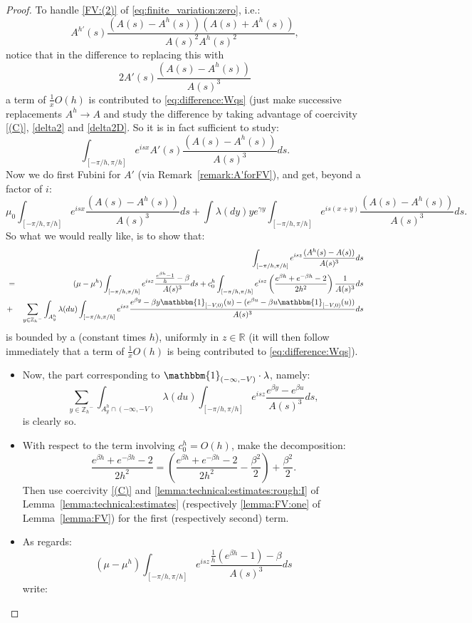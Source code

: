 \documentclass[pdftex,oneside,11pt,reqno]{amsart}
\theoremstyle{definition}
\theoremstyle{theorem}
\theoremstyle{remark}
\numberwithin{equation}{section}
\numberwithin{definition}{section}
\begin{document}
\begin{proof}
To handle \ref{FV:(2)} of \eqref{eq:finite_variation:zero}, i.e.: $$A^{h\prime}(s)\frac{(A(s)-A^h(s))(A(s)+A^h(s))}{A(s)^2A^h(s)^2},$$ notice that in the difference to replacing this with $$2A'(s)\frac{(A(s)-A^h(s))}{A(s)^3}$$ a term of $\frac{1}{x}O(h)$ is contributed to \eqref{eq:difference:Wqs} (just make successive replacements $A^h\to A$ and study the difference by taking advantage of coercivity \ref{(C)}, \ref{delta2} and \ref{delta2D}. So it is in fact sufficient to study: $$\int_{[-\pi/h,\pi/h]}e^{isx}A'(s)\frac{(A(s)-A^h(s))}{A(s)^3}ds.$$ Now we do first Fubini for $A'$ (via Remark~\ref{remark:A'forFV}), and get, beyond a factor of $i$: $$\mu_0 \int_{[-\pi/h,\pi/h]}e^{isx}\frac{(A(s)-A^h(s))}{A(s)^3}ds+\int {\lambda}(dy)ye^{\gamma y}\int_{[-\pi/h,\pi/h]}e^{is(x+y)}\frac{(A(s)-A^h(s))}{A(s)^3}ds.$$ So what we would really like, is to show that:
\footnotesize
\begin{eqnarray}
\nonumber&& \int_{[-\pi/h,\pi/h]}e^{isz}\frac{(A^h(s)-A(s))}{A(s)^3}ds\\\nonumber
&=&(\mu-\mu^h)\int_{[-\pi/h,\pi/h]}e^{isz}\frac{\frac{e^{\beta h}-1}{h}-\beta}{A(s)^3}ds+c_0^h\int_{[-\pi/h,\pi/h]}e^{isz}\left(\frac{e^{\beta h}+e^{-\beta h}-2}{2h^2}\right)\frac{1}{A(s)^3}ds\\
&+&\sum_{y\in {\mathbb{Z}_h}^-}\int_{A_y^h}{\lambda}(du)\int_{[-\pi/h,\pi/h]}e^{isz}\frac{e^{\beta y}-\beta y\mathbbm{1}_{[-V,0)}(u)-(e^{\beta u}-\beta u\mathbbm{1}_{[-V,0)}(u))}{A(s)^3}ds \label{eq:FV:Wqs:another_one}
\end{eqnarray}
\normalsize
is bounded by a (constant times $h$), uniformly in $z\in\mathbb{R}$ (it will then follow immediately that a term of $\frac{1}{x}O(h)$ is being contributed to \eqref{eq:difference:Wqs}). 
\begin{itemize}
\item Now, the part corresponding to $\mathbbm{1}_{(-\infty,-V)}\cdot {\lambda}$, namely: $$\sum_{y\in {\mathbb{Z}_h}^-}\int_{A_y^h\cap (-\infty,-V)}{\lambda}(du)\int_{[-\pi/h,\pi/h]}e^{isz}\frac{e^{\beta y}-e^{\beta u}}{A(s)^3}ds,$$ is clearly so. 
\item With respect to the term involving $c_0^h=O(h)$, make the decomposition: $$\frac{e^{\beta h}+e^{-\beta h}-2}{2h^2}=\left(\frac{e^{\beta h}+e^{-\beta h}-2}{2h^2}-\frac{\beta^2}{2}\right)+\frac{\beta^2}{2}.$$ Then use coercivity \ref{(C)} and \ref{lemma:technical:estimates:rough:I} of Lemma~\ref{lemma:technical:estimates} (respectively \eqref{lemma:FV:one} of Lemma~\ref{lemma:FV}) for the first (respectively second) term. 
\item As regards: $$(\mu-\mu^h)\int_{[-\pi/h,\pi/h]}e^{isz}\frac{\frac{1}{h}(e^{\beta h}-1)-\beta}{A(s)^3}ds$$ write:

\end{itemize}
\end{proof}
\end{document}
